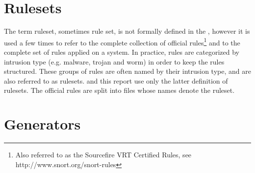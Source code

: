 
% 
\section{Rulesets}

The term ruleset, sometimes rule set, is not formally defined in the
\snortManual, however it is used a few times to refer to the complete collection
of official \snort{} rules\footnote{Also referred to as the Sourcefire VRT
Certified Rules, see http://www.snort.org/snort-rules} and to the complete set
of rules applied on a \snort{} system. In practice, rules are categorized by
intrusion type (e.g. malware, trojan and worm) in order to keep the rules
structured. These groups of rules are often named by their intrusion type, and
are also referred to as rulesets. \snowman{} and this report use only the latter
definition of rulesets. The official \snort{} rules are split into files whose
names denote the ruleset. 

\section{Generators}

